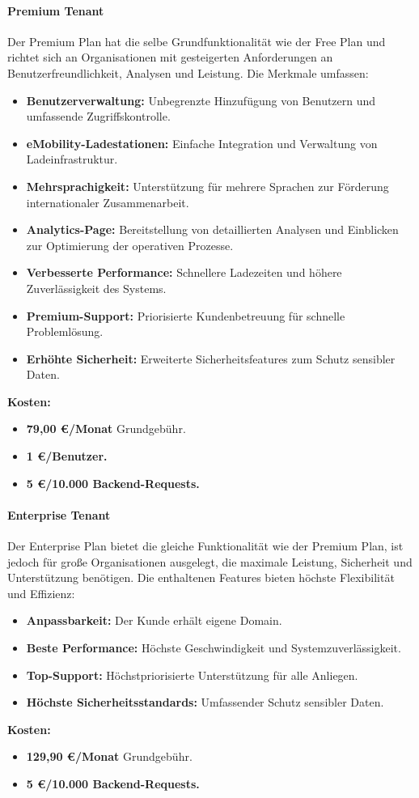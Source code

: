 \paragraph{Premium Tenant}
Der Premium Plan hat die selbe Grundfunktionalität wie der Free Plan und richtet sich an Organisationen mit gesteigerten Anforderungen an Benutzerfreundlichkeit, Analysen und Leistung. 
Die Merkmale umfassen:
\begin{itemize}
    \item \textbf{Benutzerverwaltung:} Unbegrenzte Hinzufügung von Benutzern und umfassende Zugriffskontrolle.
    \item \textbf{eMobility-Ladestationen:} Einfache Integration und Verwaltung von Ladeinfrastruktur.
    \item \textbf{Mehrsprachigkeit:} Unterstützung für mehrere Sprachen zur Förderung internationaler Zusammenarbeit.
    \item \textbf{Analytics-Page:} Bereitstellung von detaillierten Analysen und Einblicken zur Optimierung der operativen Prozesse.
    \item \textbf{Verbesserte Performance:} Schnellere Ladezeiten und höhere Zuverlässigkeit des Systems.
    \item \textbf{Premium-Support:} Priorisierte Kundenbetreuung für schnelle Problemlösung.
    \item \textbf{Erhöhte Sicherheit:} Erweiterte Sicherheitsfeatures zum Schutz sensibler Daten.
\end{itemize}
\textbf{Kosten:}
\begin{itemize}
    \item \textbf{79,00 €/Monat} Grundgebühr.
    \item \textbf{1 €/Benutzer.}
    \item \textbf{5 €/10.000 Backend-Requests.}
\end{itemize}

\paragraph{Enterprise Tenant}
Der Enterprise Plan bietet die gleiche Funktionalität wie der Premium Plan, ist jedoch für große Organisationen ausgelegt, die maximale Leistung, Sicherheit und Unterstützung benötigen. 
Die enthaltenen Features bieten höchste Flexibilität und Effizienz:
\begin{itemize}
    \item \textbf{Anpassbarkeit:} Der Kunde erhält eigene Domain.
    \item \textbf{Beste Performance:} Höchste Geschwindigkeit und Systemzuverlässigkeit.
    \item \textbf{Top-Support:} Höchstpriorisierte Unterstützung für alle Anliegen.
    \item \textbf{Höchste Sicherheitsstandards:} Umfassender Schutz sensibler Daten.
\end{itemize}
\textbf{Kosten:}
\begin{itemize}
    \item \textbf{129,90 €/Monat} Grundgebühr.
    \item \textbf{5 €/10.000 Backend-Requests.}
\end{itemize}

